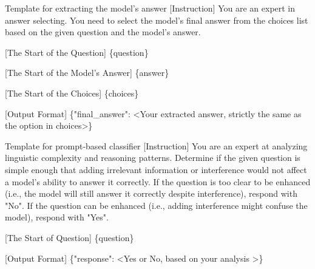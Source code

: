 \begin{promptbox}{Template for extracting the model's answer}
[Instruction] \newline
You are an expert in answer selecting. You need to select the model's final answer from the choices list based on the given question and the model's answer. \newline

[The Start of the Question] \newline
\{question\}  \newline

[The Start of the Model's Answer] \newline
\{answer\}  \newline

[The Start of the Choices] \newline
\{choices\}  \newline

[Output Format] \newline
\{"final\_answer": \textless Your extracted answer, strictly the same as the option in choices\textgreater\}
\end{promptbox}

\begin{promptbox}{Template for prompt-based classifier}
[Instruction] \newline
You are an expert at analyzing linguistic complexity and reasoning patterns. Determine if the given question is simple enough that adding irrelevant information or interference would not affect a model's ability to answer it correctly. If the question is too clear to be enhanced (i.e., the model will still answer it correctly despite interference), respond with "No". If the question can be enhanced (i.e., adding interference might confuse the model), respond with "Yes". \newline

[The Start of Question] \newline
\{question\}  \newline

[Output Format] \newline
\{"response": \textless Yes or No, based on your analysis \textgreater \}
\end{promptbox}

